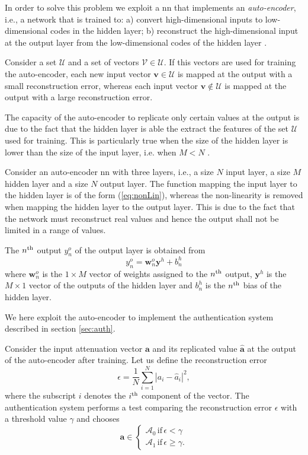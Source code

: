 \documentclass[draftcls,onecolumn,12pt]{IEEEtran}
\begin{document}
In order to solve this problem we exploit a \ac{nn} that implements an \textit{auto-encoder}, i.e., a network that is trained to: a) convert high-dimensional inputs to low-dimensional codes in the hidden layer; b) reconstruct the high-dimensional input at the output layer from the low-dimensional codes of the hidden layer \cite{Hinton-2006}.

Consider a set $\mathcal{U}$ and a set of vectors $\mathcal{V} \in \mathcal{U}$. If this vectors are used for training the auto-encoder, each new input vector $\bm{v} \in \mathcal{U}$ is mapped at the output with a small reconstruction error, whereas each input vector $\bm{v} \notin \mathcal{U} $ is mapped at the output with a large reconstruction error.

The capacity of the auto-encoder to replicate only certain values at the output is due to the fact that the hidden layer is able the extract the features of the set $\mathcal{U}$ used for training. This is particularly true when the size of the hidden layer is lower than the size of the input layer, i.e. when $M<N$ \cite{Bourlard-88}.

Consider an auto-encoder \ac{nn} with three layers, i.e., a size $N$ input layer, a size $M$ hidden layer and a size $N$ output layer.  The function mapping the input layer to the hidden layer is of the form (\ref{eq:nonLin}), whereas the non-linearity is removed when mapping the hidden layer to the output layer. This is due to the fact that the network must reconstruct real values and hence the output shall not be limited in a range of values. 

The $n^{\rm th}$ output $y_n^o$ of the output layer is obtained from
\begin{equation}
    y_n^o= \bm{w}_n^o\bm{y}^h+b_n^{h}
\end{equation}
where $\bm{w}_n^o$ is the $1\times M$ vector of weights assigned to the $n^{\rm th}$ output, $\bm{y}^h$ is the $M\times 1$ vector of the outputs of the hidden layer and $b_n^h$ is the $n^{\rm th}$ bias of the hidden layer.


We here exploit the auto-encoder to implement the authentication system described in section \ref{sec:auth}. 

Consider the input attenuation vector $\bm{a}$ and its replicated value $\hat{\bm{a}}$ at the output of the auto-encoder after training.
Let us define the reconstruction error
\begin{equation}
    \epsilon = \frac{1}{N}\sum_{i=1}^{N}|a_i-\hat{a}_i|^2,
\end{equation}
where the subscript $i$ denotes the $i^{\rm th}$ component of the vector. The authentication system performs a test comparing the reconstruction error $\epsilon$ with a threshold value $\gamma$ and chooses 
\begin{equation}
\bm{a} \in
\begin{cases}
\mathcal{A}_0 \, \text{if} \, \epsilon < \gamma \\
\mathcal{A}_1 \, \text{if} \, \epsilon \ge \gamma. 
\end{cases}
\end{equation}
\end{document}
